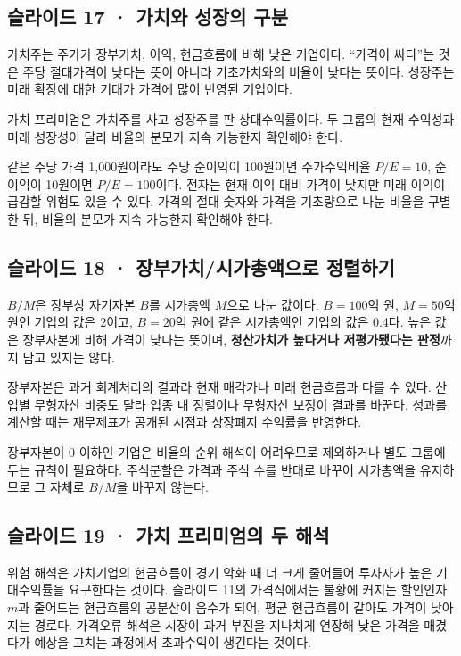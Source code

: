 \documentclass[11pt,a4paper]{article}
\begin{document}
\subsection{슬라이드 17 · 가치와 성장의 구분}
가치주는 주가가 장부가치, 이익, 현금흐름에 비해 낮은 기업이다. “가격이 싸다”는 것은 주당 절대가격이 낮다는 뜻이 아니라 기초가치와의 비율이 낮다는 뜻이다. 성장주는 미래 확장에 대한 기대가 가격에 많이 반영된 기업이다.\par

가치 프리미엄은 가치주를 사고 성장주를 판 상대수익률이다. 두 그룹의 현재 수익성과 미래 성장성이 달라 비율의 분모가 지속 가능한지 확인해야 한다.\par

같은 주당 가격 1,000원이라도 주당 순이익이 100원이면 주가수익비율 $P/E=10$, 순이익이 10원이면 $P/E=100$이다. 전자는 현재 이익 대비 가격이 낮지만 미래 이익이 급감할 위험도 있을 수 있다. 가격의 절대 숫자와 가격을 기초량으로 나눈 비율을 구별한 뒤, 비율의 분모가 지속 가능한지 확인해야 한다.\par

\subsection{슬라이드 18 · 장부가치/시가총액으로 정렬하기}
$B/M$은 장부상 자기자본 $B$를 시가총액 $M$으로 나눈 값이다. $B=100$억 원, $M=50$억 원인 기업의 값은 2이고, $B=20$억 원에 같은 시가총액인 기업의 값은 0.4다. 높은 값은 장부자본에 비해 가격이 낮다는 뜻이며, \textbf{청산가치가 높다거나 저평가됐다는 판정}까지 담고 있지는 않다.\par

장부자본은 과거 회계처리의 결과라 현재 매각가나 미래 현금흐름과 다를 수 있다. 산업별 무형자산 비중도 달라 업종 내 정렬이나 무형자산 보정이 결과를 바꾼다. 성과를 계산할 때는 재무제표가 공개된 시점과 상장폐지 수익률을 반영한다.\par

장부자본이 0 이하인 기업은 비율의 순위 해석이 어려우므로 제외하거나 별도 그룹에 두는 규칙이 필요하다. 주식분할은 가격과 주식 수를 반대로 바꾸어 시가총액을 유지하므로 그 자체로 $B/M$을 바꾸지 않는다.\par

\subsection{슬라이드 19 · 가치 프리미엄의 두 해석}
위험 해석은 가치기업의 현금흐름이 경기 악화 때 더 크게 줄어들어 투자자가 높은 기대수익률을 요구한다는 것이다. 슬라이드 11의 가격식에서는 불황에 커지는 할인인자 $m$과 줄어드는 현금흐름의 공분산이 음수가 되어, 평균 현금흐름이 같아도 가격이 낮아지는 경로다. 가격오류 해석은 시장이 과거 부진을 지나치게 연장해 낮은 가격을 매겼다가 예상을 고치는 과정에서 초과수익이 생긴다는 것이다.\par
\end{document}
